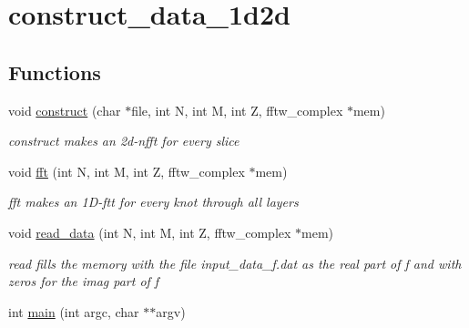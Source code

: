 \hypertarget{group__applications__mri3d__construct__data__1d2d}{
\section{construct\_\-data\_\-1d2d}
\label{group__applications__mri3d__construct__data__1d2d}
}
\subsection*{Functions}
\begin{CompactItemize}
\item 
\hypertarget{group__applications__mri3d__construct__data__1d2d_g6af368990d9ae8e919ad14d65fdfbf49}{
void \hyperlink{group__applications__mri3d__construct__data__1d2d_g6af368990d9ae8e919ad14d65fdfbf49}{construct} (char $\ast$file, int N, int M, int Z, fftw\_\-complex $\ast$mem)}
\label{group__applications__mri3d__construct__data__1d2d_g6af368990d9ae8e919ad14d65fdfbf49}

\begin{CompactList}\small\item\em construct makes an 2d-nfft for every slice \item\end{CompactList}\item 
\hypertarget{group__applications__mri3d__construct__data__1d2d_g2c689d25296f70a4395e776e58922c15}{
void \hyperlink{group__applications__mri3d__construct__data__1d2d_g2c689d25296f70a4395e776e58922c15}{fft} (int N, int M, int Z, fftw\_\-complex $\ast$mem)}
\label{group__applications__mri3d__construct__data__1d2d_g2c689d25296f70a4395e776e58922c15}

\begin{CompactList}\small\item\em fft makes an 1D-ftt for every knot through all layers \item\end{CompactList}\item 
\hypertarget{group__applications__mri3d__construct__data__1d2d_gbbcd2d8eaf7ab5e3a824232a9047222c}{
void \hyperlink{group__applications__mri3d__construct__data__1d2d_gbbcd2d8eaf7ab5e3a824232a9047222c}{read\_\-data} (int N, int M, int Z, fftw\_\-complex $\ast$mem)}
\label{group__applications__mri3d__construct__data__1d2d_gbbcd2d8eaf7ab5e3a824232a9047222c}

\begin{CompactList}\small\item\em read fills the memory with the file input\_\-data\_\-f.dat as the real part of f and with zeros for the imag part of f \item\end{CompactList}\item 
\hypertarget{group__applications__mri3d__construct__data__1d2d_g3c04138a5bfe5d72780bb7e82a18e627}{
int \hyperlink{group__applications__mri3d__construct__data__1d2d_g3c04138a5bfe5d72780bb7e82a18e627}{main} (int argc, char $\ast$$\ast$argv)}
\label{group__applications__mri3d__construct__data__1d2d_g3c04138a5bfe5d72780bb7e82a18e627}

\end{CompactItemize}
